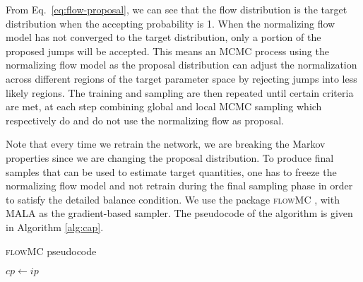 \documentclass[twocolumn]{aastex631}
\begin{document}
From Eq.~\eqref{eq:flow-proposal}, we can see that the flow distribution is the
target distribution when the accepting probability is 1. When the normalizing
flow model has not converged to the target distribution, only a portion of the
proposed jumps will be accepted. This means an MCMC process using the
normalizing flow model as the proposal distribution can adjust the
normalization across different regions of the target parameter space by
rejecting jumps into less likely regions. The training and sampling are then
repeated until certain criteria are met, at each step combining global and
local MCMC sampling which respectively do and do not use the normalizing flow
as proposal.

Note that every time we retrain the network, we are breaking the Markov
properties since we are changing the proposal distribution. To produce final
samples that can be used to estimate target quantities, one has to freeze the
normalizing flow model and not retrain during the final sampling phase in order
to satisfy the detailed balance condition. We use the package \textsc{flowMC}
\cite{2022arXiv221106397W,Gabrie:2021tlu}, with MALA as the gradient-based sampler. The
pseudocode of the algorithm is given in Algorithm \ref{alg:cap}.

\begin{algorithm}
\caption{\textsc{flowMC} pseudocode}\label{alg:cap}
$cp \leftarrow ip$\\

\end{algorithm}
\end{document}
